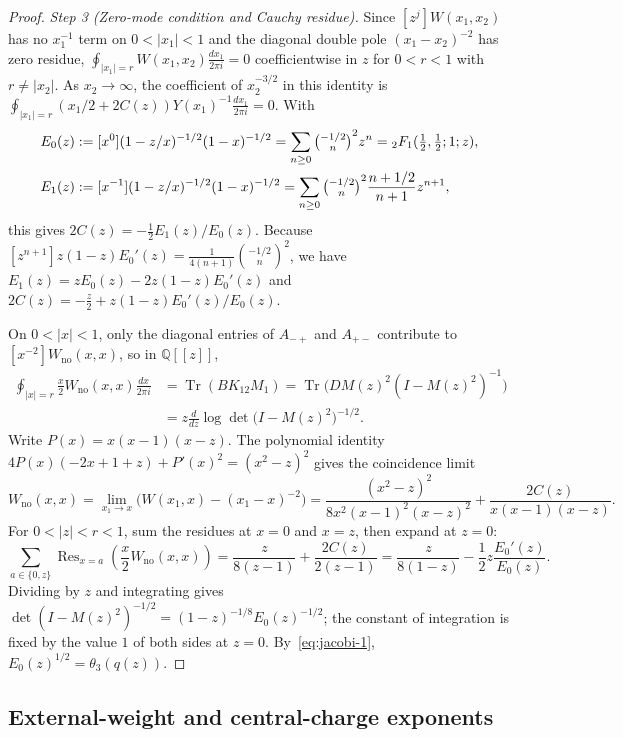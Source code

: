 \documentclass[twoside,10pt]{article}
\numberwithin{equation}{section}
\theoremstyle{slbody}
\theoremstyle{definition}
\theoremstyle{remark}
\newcommand{\Tr}{\operatorname{Tr}}
\newcommand{\Res}{\operatorname{Res}}
\begin{document}
\begin{proof}
\emph{Step 3 (Zero-mode condition and Cauchy residue).}  Since
\([z^j]W(x_1,x_2)\) has no \(x_1^{-1}\) term on \(0<|x_1|<1\) and the
diagonal double pole \((x_1-x_2)^{-2}\) has zero residue,
\(\oint_{|x_1|=r}W(x_1,x_2)\frac{dx_1}{2\pi i}=0\) coefficientwise in \(z\)
for \(0<r<1\) with \(r\neq|x_2|\).  As \(x_2\to\infty\), the coefficient of
\(x_2^{-3/2}\) in this identity is
\(\oint_{|x_1|=r}(x_1/2+2C(z))Y(x_1)^{-1}\frac{dx_1}{2\pi i}=0\).  With
\begin{align*}
 E_0(z)&:=[x^0](1-z/x)^{-1/2}(1-x)^{-1/2}
  =\sum_{n\geq0}\tbinom{-1/2}{n}^2z^n={}_2F_1(\tfrac12,\tfrac12;1;z),\\
 E_1(z)&:=[x^{-1}](1-z/x)^{-1/2}(1-x)^{-1/2}
  =\sum_{n\geq0}\tbinom{-1/2}{n}^2\frac{n+1/2}{n+1}z^{n+1},
\end{align*}
this gives \(2C(z)=-\frac12 E_1(z)/E_0(z)\).  Because \([z^{n+1}]z(1-z)E_0'(z)=\frac{1}{4(n+1)}\binom{-1/2}{n}^2\), we
have \(E_1(z)=zE_0(z)-2z(1-z)E_0'(z)\) and
\(2C(z)=-\frac{z}{2}+z(1-z)E_0'(z)/E_0(z)\).

On \(0<|x|<1\), only the diagonal entries of \(A_{-+}\) and
\(A_{+-}\) contribute to \([x^{-2}]W_{\mathrm{no}}(x,x)\), so in
\(\mathbb Q[[z]]\),
\begin{align*}
 \oint_{|x|=r}\frac{x}{2}W_{\mathrm{no}}(x,x)\frac{dx}{2\pi i}
 &=\Tr(BK_{12}M_1)
  =\Tr\bigl(DM(z)^2(I-M(z)^2)^{-1}\bigr)\\
 &=z\frac{d}{dz}\log\det\bigl(I-M(z)^2\bigr)^{-1/2}.
\end{align*}
Write \(P(x)=x(x-1)(x-z)\).  The polynomial identity
\(4P(x)(-2x+1+z)+P'(x)^2=(x^2-z)^2\) gives the coincidence limit
\[
 W_{\mathrm{no}}(x,x)=\lim_{x_1\to x}\bigl(W(x_1,x)-(x_1-x)^{-2}\bigr)
 =\frac{(x^2-z)^2}{8x^2(x-1)^2(x-z)^2}+\frac{2C(z)}{x(x-1)(x-z)}.
\]
For \(0<|z|<r<1\), sum the residues at \(x=0\) and \(x=z\), then expand at
\(z=0\):
\[
 \sum_{a\in\{0,z\}}\Res_{x=a}\!\left(\frac{x}{2}W_{\mathrm{no}}(x,x)\right)
 =\frac{z}{8(z-1)}+\frac{2C(z)}{2(z-1)}
 =\frac{z}{8(1-z)}-\frac12 z\frac{E_0'(z)}{E_0(z)}.
\]
Dividing by \(z\) and integrating gives
\(\det(I-M(z)^2)^{-1/2}=(1-z)^{-1/8}E_0(z)^{-1/2}\); the constant of
integration is fixed by the value \(1\) of both sides at \(z=0\).
By~\eqref{eq:jacobi-1}, \(E_0(z)^{1/2}=\theta_3(q(z))\).
\end{proof}

\subsection{External-weight and central-charge exponents}
\end{document}
